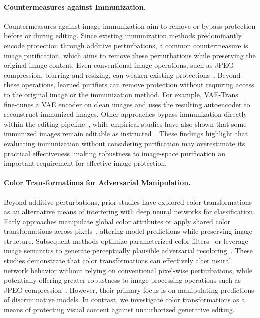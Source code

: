 \paragraph{Countermeasures against Immunization.}
Countermeasures against image immunization aim to remove or bypass protection before or during editing. Since existing immunization methods predominantly encode protection through additive perturbations, a common countermeasure is image purification, which aims to remove these perturbations while preserving the original image content. Even conventional image operations, such as JPEG compression, blurring and resizing, can weaken existing protections~\cite{sandoval2023jpeg,blurguard2025,honig2025noisyupscaling}. Beyond these operations, learned purifiers can remove protection without requiring access to the original image or the immunization method. For example, VAE-Trans~\cite{purifyonce2026} fine-tunes a VAE encoder on clean images and uses the resulting autoencoder to reconstruct immunized images. Other approaches bypass immunization directly within the editing pipeline~\cite{cat2025}, while empirical studies have also shown that some immunized images remain editable as instructed~\cite{icip2025disruptive,doprotect2026}. 
These findings highlight that evaluating immunization without considering purification may overestimate its practical effectiveness, making robustness to image-space purification an important requirement for effective image protection.


\paragraph{Color Transformations for Adversarial Manipulation.}
Beyond additive perturbations, prior studies have explored color transformations as an alternative means of interfering with deep neural networks for classification. Early approaches manipulate global color attributes or apply shared color transformations across pixels~\cite{hosseini2018semantic,laidlaw2019functional}, altering model predictions while preserving image structure. Subsequent methods optimize parameterized color filters~\cite{zhao2020ace,zhao2023advcf} or leverage image semantics to generate perceptually plausible adversarial recoloring~\cite{shamsabadi2020colorfool,bhattad2020cadv,yuan2022ncf}. These studies demonstrate that color transformations can effectively alter neural network behavior without relying on conventional pixel-wise perturbations, while potentially offering greater robustness to image processing operations such as JPEG compression~\cite{zhao2023advcf}. However, their primary focus is on manipulating predictions of discriminative models. In contrast, we investigate color transformations as a means of protecting visual content against unauthorized generative editing.


